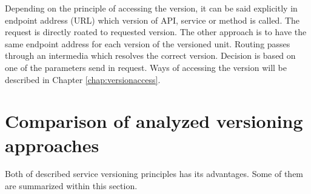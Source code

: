 Depending on the principle of accessing the version, it can be said explicitly in endpoint address (URL) which version of API, service or method is called. The request is directly roated to requested version. The other approach is to have the same endpoint address for each version of the versioned unit. Routing passes through an intermedia which resolves the correct version. Decision is based on one of the parameters send in request. Ways of accessing the version will be described in Chapter \ref{chap:versionaccess}.


\section{Comparison of analyzed versioning approaches}
Both of described service versioning principles has its advantages. Some of them are summarized within this section. 

